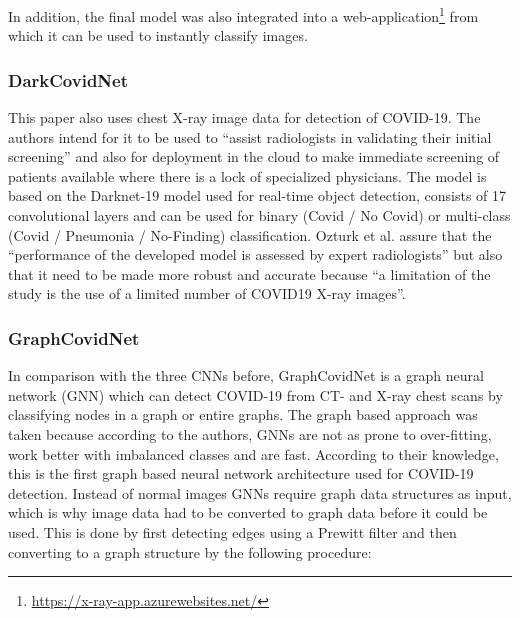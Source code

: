 In addition, the final model was also integrated into a web-application\footnote{\url{https://x-ray-app.azurewebsites.net/}} from which it can be used to instantly classify images.

\subsubsection{DarkCovidNet}
This paper also uses chest X-ray image data for detection of COVID-19. The authors intend for it to be used to \enquote{assist radiologists in validating their initial screening}\cite{dark_net} and also for deployment in the cloud to make immediate screening of patients available where there is a lock of specialized physicians. The model is based on the Darknet-19 model used for real-time object detection\cite{darknet_19}, consists of 17 convolutional layers and can be used for binary (Covid / No Covid) or multi-class (Covid / Pneumonia / No-Finding) classification.
Ozturk et al. assure that the \enquote{performance of the developed model is assessed by expert radiologists} but also that it need to be made more robust and accurate because \enquote{a limitation of the study is the use of a limited number of COVID19 X-ray images}\cite{dark_net}.

\subsubsection{GraphCovidNet}\label{subsubsec:methods_graphcovidnet}
In comparison with the three CNNs before, GraphCovidNet is a graph neural network (GNN) which can detect COVID-19 from CT- and X-ray chest scans by classifying nodes in a graph or entire graphs. The graph based approach was taken because according to the authors, GNNs are not as prone to over-fitting, work better with imbalanced classes and are fast\cite{graph_covid_net}. According to their knowledge, this is the first graph based neural network architecture used for COVID-19 detection.
Instead of normal images GNNs require graph data structures as input, which is why image data had to be converted to graph data before it could be used. This is done by first detecting edges using a Prewitt filter and then converting to a graph structure by the following procedure:

